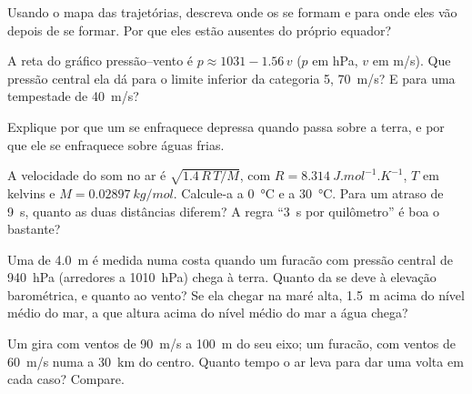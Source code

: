 \begin{exercise}[$\star\star$]\label{exo:g10:storms-and-cyclones:9}
Usando o mapa das trajetórias, descreva onde os  se formam
e para onde eles vão depois de se formar. Por que eles estão ausentes do
próprio equador?
\end{exercise}

\begin{exercise}[$\star\star$]\label{exo:g10:storms-and-cyclones:10}
A reta do gráfico pressão--vento é $p \approx 1031 - 1.56\,v$ ($p$ em
\unit{hPa}, $v$ em \unit{m/s}). Que pressão central ela dá para o limite
inferior da categoria 5, \qty{70}{m/s}? E para uma tempestade de
\qty{40}{m/s}?
\end{exercise}

\begin{exercise}[$\star\star$]\label{exo:g10:storms-and-cyclones:11}
Explique por que um  se enfraquece depressa quando passa
sobre a terra, e por que ele se enfraquece sobre águas frias.
\end{exercise}

\begin{exercise}[$\star\star\star$]\label{exo:g10:storms-and-cyclones:12}
A velocidade do som no ar é $\sqrt{1.4\,R\,T/M}$, com $R =
\qty{8.314}{J.mol^{-1}.K^{-1}}$, $T$ em kelvins e $M =
\qty{0.02897}{kg/mol}$. Calcule-a a \qty{0}{\degreeCelsius} e a
\qty{30}{\degreeCelsius}. Para um atraso de \qty{9}{s}, quanto as duas
distâncias diferem? A regra ``\qty{3}{s} por quilômetro'' é boa o bastante?
\end{exercise}

\begin{exercise}[$\star\star\star$]\label{exo:g10:storms-and-cyclones:13}
Uma  de \qty{4.0}{m} é medida numa costa quando um furacão
com pressão central de \qty{940}{hPa} (arredores a \qty{1010}{hPa}) chega à
terra. Quanto da  se deve à elevação barométrica, e quanto
ao vento? Se ela chegar na maré alta, \qty{1.5}{m} acima do nível médio do
mar, a que altura acima do nível médio do mar a água chega?
\end{exercise}

\begin{exercise}[$\star\star\star$]\label{exo:g10:storms-and-cyclones:14}
Um  gira com ventos de \qty{90}{m/s} a \qty{100}{m} do seu eixo; um
furacão, com ventos de \qty{60}{m/s} numa  a \qty{30}{km} do
centro. Quanto tempo o ar leva para dar uma volta em cada caso? Compare.
\end{exercise}

